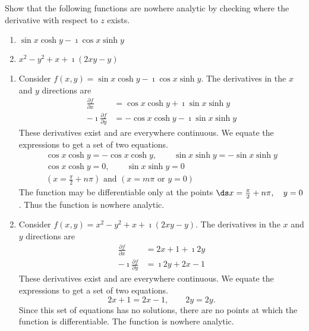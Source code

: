 \begin{example}
 Show that the following functions are nowhere analytic by checking where the
  derivative with respect to $z$ exists.  
  \begin{enumerate}
  \item $\sin x \cosh y - \imath \cos x \sinh y$
  \item $x^2 - y^2 + x + \imath (2 x y - y)$
  \end{enumerate}
 \end{example}
 
 \begin{solution}
   \begin{enumerate}
  \item
    Consider $f(x,y) = \sin x \cosh y - \imath \cos x \sinh y$.
    The derivatives in the $x$ and $y$ directions are
    \begin{align*}
      \frac{\partial f}{\partial x} &= \cos x \cosh y + \imath \sin x \sinh y 
      \\
      -\imath  \frac{\partial f}{\partial y} &= - \cos x \cosh y - \imath \sin x \sinh y
    \end{align*}
    These derivatives exist and are everywhere continuous.  We equate the
    expressions to get a set of two equations.
    \begin{gather*}
      \cos x \cosh y = - \cos x \cosh y, \qquad
      \sin x \sinh y = - \sin x \sinh y 
      \\
      \cos x \cosh y = 0, \qquad
      \sin x \sinh y = 0 
      \\
      \left( x = \frac{\pi}{2} + n \pi \right) \text{ and }
      \left( x = m \pi \text{ or } y = 0 \right) 
    \end{gather*}
    The function may be differentiable only at the points $\ds x = \frac{\pi}{2} + n \pi, \quad y = 0$.
    Thus the function is nowhere analytic.
  \item 
    Consider $f(x,y) = x^2 - y^2 + x + \imath (2 x y - y)$.
    The derivatives in the $x$ and $y$ directions are
    \begin{align*}
      \frac{\partial f}{\partial x} &= 2 x + 1 + \imath 2 y 
      \\
      -\imath  \frac{\partial f}{\partial y} &= \imath 2 y + 2 x - 1
    \end{align*}
    These derivatives exist and are everywhere continuous.  We equate the
    expressions to get a set of two equations.
    \[
    2 x + 1 = 2 x - 1, \qquad 2 y = 2 y.
    \]
    Since this set of equations has no solutions, there are no points at which
    the function is differentiable.  The function is nowhere analytic.
  \end{enumerate}
\end{solution}


